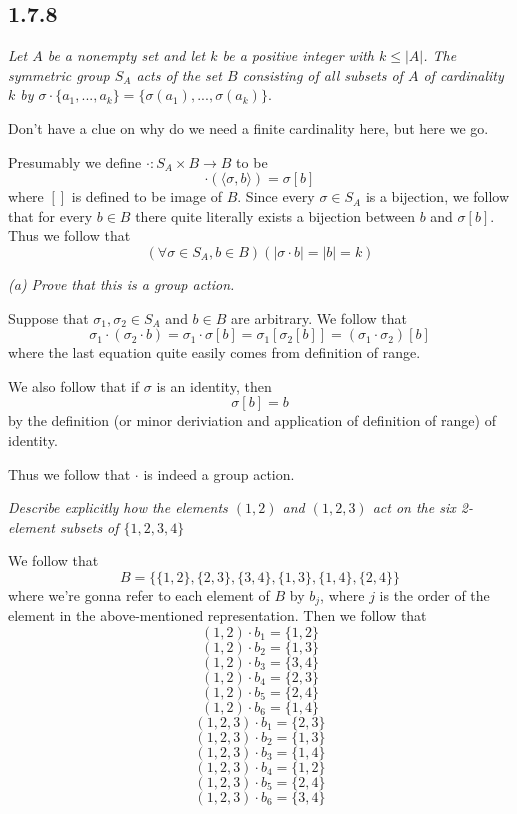 \documentclass[11pt,oneside,titlepage]{book}
\newcommand{\eangle}[1]{\langle #1 \rangle}
\begin{document}
\subsection*{1.7.8}

\textit{Let $A$ be a nonempty set and let $k$ be a positive integer with $k \leq |A|$. The
  symmetric group $S_A$ acts of the set $B$ consisting of all subsets of $A$ of
  cardinality $k$ by $\sigma \cdot \{a_1, ..., a_k\} =   \{\sigma(a_1), ..., \sigma(a_k)\}$}.

Don't have a clue on why do we need a finite cardinality here, but here we go.

Presumably we define $\cdot: S_A \times B \to B$ to be
$$\cdot(\eangle{\sigma, b}) = \sigma[b]$$
where $[]$ is defined to be image of $B$.
Since every $\sigma \in S_A$ is a bijection, we follow that for every $b \in B$
there quite literally exists a bijection between $b$ and $\sigma[b]$. Thus we follow that
$$(\forall \sigma \in S_A, b \in B)(|\sigma \cdot b| = |b| = k)$$


\textit{(a) Prove that this is a group action.}

Suppose that $\sigma_1, \sigma_2 \in S_A$ and  $b \in B$ are arbitrary. We follow that
$$\sigma_1 \cdot (\sigma_2 \cdot b) = \sigma_1 \cdot \sigma[b] = \sigma_1 [\sigma_2[b]] =
(\sigma_1 \cdot \sigma_2)[b]$$
where the last equation quite easily comes from definition of range.

We also follow that if $\sigma$ is an identity, then
$$\sigma[b] = b$$
by the definition (or minor deriviation and application of definition of range) of identity.

Thus we follow that $\cdot$ is indeed a group action.

\textit{Describe explicitly how the elements $(1, 2)$ and $(1, 2, 3)$ act on the six 2-element
  subsets of $\{1, 2, 3, 4\}$}

We follow that
$$B = \{\{1, 2\}, \{2, 3\}, \{3, 4\}, \{1, 3\}, \{1, 4\}, \{2, 4\}\}$$
where we're gonna refer to each element of $B$ by $b_j$, where $j$ is the order of
the element in the above-mentioned representation. Then we follow that
$$(1, 2) \cdot b_1 = \{1, 2\}$$
$$(1, 2) \cdot b_2 = \{1, 3\}$$
$$(1, 2) \cdot b_3 = \{3, 4\}$$
$$(1, 2) \cdot b_4 = \{2, 3\}$$
$$(1, 2) \cdot b_5 = \{2, 4\}$$
$$(1, 2) \cdot b_6 = \{1, 4\}$$
$$(1, 2, 3) \cdot b_1 = \{2, 3\}$$
$$(1, 2, 3) \cdot b_2 = \{1, 3\}$$
$$(1, 2, 3) \cdot b_3 = \{1, 4\}$$
$$(1, 2, 3) \cdot b_4 = \{1, 2\}$$
$$(1, 2, 3) \cdot b_5 = \{2, 4\}$$
$$(1, 2, 3) \cdot b_6 = \{3, 4\}$$
\end{document}
